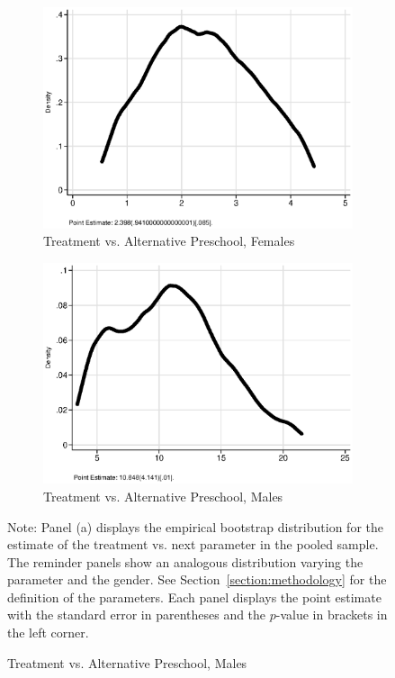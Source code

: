 \begin{figure}
\begin{subfigure}[h]{0.25\textwidth}
\end{subfigure}%
\begin{subfigure}[h]{0.25\textwidth}
	\centering
	\caption{Treatment vs. Alternative Preschool, Females}
		\includegraphics[width=\textwidth]{output/ratios_8_sexf.eps}
\end{subfigure}%
\begin{subfigure}[h]{0.25\textwidth}
	\centering
	\caption{Treatment vs. Alternative Preschool, Males}
		\includegraphics[width=\textwidth]{output/ratios_8_sexm.eps}
\end{subfigure}
\footnotesize \justify
Note: Panel (a) displays the empirical bootstrap distribution for the estimate of the treatment vs. next parameter in the pooled sample. The reminder panels show an analogous distribution varying the parameter and the gender. See Section~\ref{section:methodology} for the definition of the parameters. Each panel displays the point estimate with the standard error in parentheses and the $p$-value in brackets in the left corner.
\end{figure}
\restoregeometry
\doublespacing


